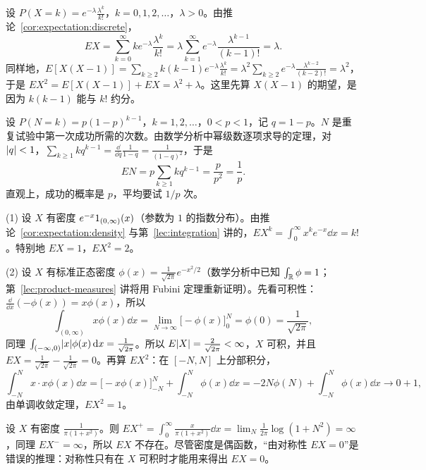 \begin{example}[Poisson 分布]\label{ex:expectation:poisson}
设 $P(X=k)=e^{-\lambda}\frac{\lambda^k}{k!}$，$k=0,1,2,\dots$，$\lambda>0$。由推论~\ref{cor:expectation:discrete}，
\[
EX=\sum_{k=0}^\infty ke^{-\lambda}\frac{\lambda^k}{k!}=\lambda\sum_{k=1}^\infty e^{-\lambda}\frac{\lambda^{k-1}}{(k-1)!}=\lambda .
\]
同样地，$E[X(X-1)]=\sum_{k\geqslant2}k(k-1)e^{-\lambda}\frac{\lambda^k}{k!}=\lambda^2\sum_{k\geqslant2}e^{-\lambda}\frac{\lambda^{k-2}}{(k-2)!}=\lambda^2$，于是 $EX^2=E[X(X-1)]+EX=\lambda^2+\lambda$。这里先算 $X(X-1)$ 的期望，是因为 $k(k-1)$ 能与 $k!$ 约分。
\end{example}

\begin{example}[几何分布]\label{ex:expectation:geometric}
设 $P(N=k)=p(1-p)^{k-1}$，$k=1,2,\dots$，$0<p<1$，记 $q=1-p$。$N$ 是重复试验中第一次成功所需的次数。由数学分析中幂级数逐项求导的定理，对 $\lvert q\rvert<1$，$\sum_{k\geqslant1}kq^{k-1}=\frac{\dd}{\dd q}\frac1{1-q}=\frac1{(1-q)^2}$，于是
\[
EN=p\sum_{k\geqslant1}kq^{k-1}=\frac p{p^2}=\frac1p .
\]
直观上，成功的概率是 $p$，平均要试 $1/p$ 次。
\end{example}

\begin{example}[指数分布与正态分布]\label{ex:expectation:exp-normal}
(1) 设 $X$ 有密度 $e^{-x}1_{(0,\infty)}(x)$（参数为 $1$ 的指数分布）。由推论~\ref{cor:expectation:density} 与第~\ref{lec:integration} 讲的，$EX^k=\int_0^\infty x^ke^{-x}\dd x=k!$。特别地 $EX=1$，$EX^2=2$。

(2) 设 $X$ 有标准正态密度 $\phi(x)=\frac1{\sqrt{2\pi}}e^{-x^2/2}$（数学分析中已知 $\int_{\mathbb{R}}\phi=1$；第~\ref{lec:product-measures} 讲将用 Fubini 定理重新证明）。先看可积性：$\frac{\dd}{\dd x}(-\phi(x))=x\phi(x)$，所以
\[
\int_{(0,\infty)}x\phi(x)\dd x=\lim_{N\to\infty}\bigl[-\phi(x)\bigr]_0^N=\phi(0)=\frac1{\sqrt{2\pi}},
\]
同理 $\int_{(-\infty,0)}\lvert x\rvert\phi(x)\,\mathrm{d} x=\frac1{\sqrt{2\pi}}$。所以 $E\lvert X\rvert=\frac2{\sqrt{2\pi}}<\infty$，$X$ 可积，并且 $EX=\frac1{\sqrt{2\pi}}-\frac1{\sqrt{2\pi}}=0$。再算 $EX^2$：在 $[-N,N]$ 上分部积分，
\[
\int_{-N}^Nx\cdot x\phi(x)\dd x=\bigl[-x\phi(x)\bigr]_{-N}^N+\int_{-N}^N\phi(x)\dd x=-2N\phi(N)+\int_{-N}^N\phi(x)\dd x\to0+1,
\]
由单调收敛定理，$EX^2=1$。
\end{example}

\begin{example}\label{ex:expectation:cauchy}
设 $X$ 有密度 $\frac1{\pi(1+x^2)}$。则 $EX^+=\int_0^\infty\frac x{\pi(1+x^2)}\dd x=\lim_N\frac1{2\pi}\log(1+N^2)=\infty$，同理 $EX^-=\infty$，所以 $EX$ 不存在。尽管密度是偶函数，“由对称性 $EX=0$”是错误的推理：对称性只有在 $X$ 可积时才能用来得出 $EX=0$。
\end{example}


